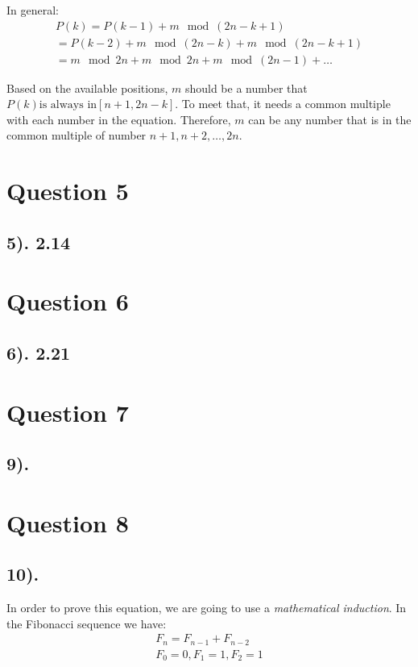 \documentclass[12pt]{article}
\begin{document}
In general:
\begin{gather*}
    P(k) = P(k-1) + m \mod {(2n-k+1)} \\
    = P(k-2) + m \mod {(2n-k)} + m \mod {(2n-k+1)} \\
    = m \mod 2n + m \mod 2n + m \mod {(2n-1)} + \ldots
\end{gather*}

Based on the available positions, $m$ should be a number that $P(k) \text{is always in} [n+1, 2n-k]$. To meet that, it needs a common multiple with each number
in the equation. Therefore, $m$ can be any number that is in the common multiple of number $n+1, n+2, \ldots, 2n$.

\section*{Question 5}
\subsection*{5). 2.14}

\section*{Question 6}
\subsection*{6). 2.21}

\section*{Question 7}
\subsection*{9).}

\section*{Question 8}
\subsection*{10).}
In order to prove this equation, we are going to use a \textit{mathematical induction}. In the Fibonacci sequence we have:
\begin{gather*}
    F_{n} = F_{n-1} + F_{n-2} \\
    F_{0}=0, F_{1}=1, F_{2}=1
\end{gather*}
\end{document}
